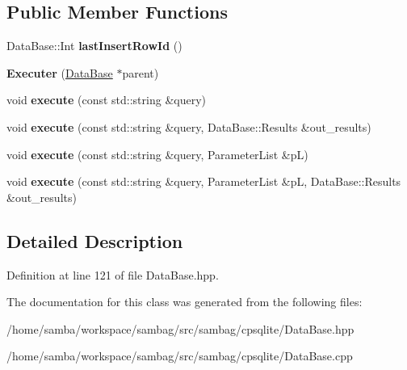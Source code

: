 \subsection*{Public Member Functions}
\begin{DoxyCompactItemize}
\item 
\hypertarget{classsambag_1_1cpsqlite_1_1_data_base_1_1_executer_ace2984791e378cdc907972cfdc47c4f7}{
DataBase::Int {\bfseries lastInsertRowId} ()}
\label{classsambag_1_1cpsqlite_1_1_data_base_1_1_executer_ace2984791e378cdc907972cfdc47c4f7}

\item 
\hypertarget{classsambag_1_1cpsqlite_1_1_data_base_1_1_executer_aa4bda8797ed57fd964c1b6273bd12631}{
{\bfseries Executer} (\hyperlink{classsambag_1_1cpsqlite_1_1_data_base}{DataBase} $\ast$parent)}
\label{classsambag_1_1cpsqlite_1_1_data_base_1_1_executer_aa4bda8797ed57fd964c1b6273bd12631}

\item 
\hypertarget{classsambag_1_1cpsqlite_1_1_data_base_1_1_executer_a99fb6e9657c11127406a6da6b0cca162}{
void {\bfseries execute} (const std::string \&query)}
\label{classsambag_1_1cpsqlite_1_1_data_base_1_1_executer_a99fb6e9657c11127406a6da6b0cca162}

\item 
\hypertarget{classsambag_1_1cpsqlite_1_1_data_base_1_1_executer_acd8d2dc2d210c44bd9f8116420a114bb}{
void {\bfseries execute} (const std::string \&query, DataBase::Results \&out\_\-results)}
\label{classsambag_1_1cpsqlite_1_1_data_base_1_1_executer_acd8d2dc2d210c44bd9f8116420a114bb}

\item 
\hypertarget{classsambag_1_1cpsqlite_1_1_data_base_1_1_executer_ab6120474c7b0235045a536fde65a6450}{
void {\bfseries execute} (const std::string \&query, ParameterList \&pL)}
\label{classsambag_1_1cpsqlite_1_1_data_base_1_1_executer_ab6120474c7b0235045a536fde65a6450}

\item 
\hypertarget{classsambag_1_1cpsqlite_1_1_data_base_1_1_executer_adc3895efbfdaba6c4270cbe0ab38936a}{
void {\bfseries execute} (const std::string \&query, ParameterList \&pL, DataBase::Results \&out\_\-results)}
\label{classsambag_1_1cpsqlite_1_1_data_base_1_1_executer_adc3895efbfdaba6c4270cbe0ab38936a}

\end{DoxyCompactItemize}


\subsection{Detailed Description}


Definition at line 121 of file DataBase.hpp.



The documentation for this class was generated from the following files:\begin{DoxyCompactItemize}
\item 
/home/samba/workspace/sambag/src/sambag/cpsqlite/DataBase.hpp\item 
/home/samba/workspace/sambag/src/sambag/cpsqlite/DataBase.cpp\end{DoxyCompactItemize}
